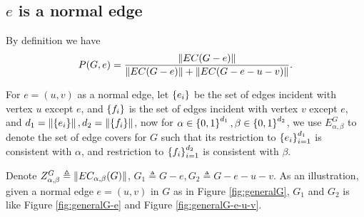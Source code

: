 \subsection{$e$ is a normal edge}
By definition we have
\begin{equation}
	P(G,e) = \frac{\left\Vert EC(G-e)\right\Vert}{\left\Vert EC(G-e)\right\Vert + \left\Vert EC(G-e-u-v)\right\Vert }.
\end{equation}


	For $e=(u,v)$ as a normal edge, let $\left\{e_i\right\}$ be the set of edges incident with vertex $u$ except $e$, and $\left\{f_i\right\}$ is the set of edges incident with vertex $v$ except $e$, and $d_1 = \left\Vert\left\{e_i\right\}\right\Vert, d_2 = \left\Vert\left\{f_i\right\}\right\Vert$, now for $\alpha \in \left\{0,1\right\}^{d_1}, \beta \in \left\{0,1\right\}^{d_2}$, we use $E_{\alpha,\beta}^G$ to denote the set of edge covers for $G$ such that its restriction to $\left\{e_i\right\}_{i=1}^{d_1}$ is consistent with $\alpha$, and restriction to $\left\{f_i\right\}_{i=1}^{d_2}$ is consistent with $\beta$.

	Denote $Z_{\alpha, \beta}^G \triangleq \left\Vert EC_{\alpha, \beta}(G)\right\Vert$, $G_1 \triangleq G-e, G_2 \triangleq G-e-u-v$. As an illustration, given a normal edge $e=(u,v)$ in $G$ as in Figure \ref{fig:generalG}, $G_1$ and $G_2$ is like Figure \ref{fig:generalG-e} and Figure \ref{fig:generalG-e-u-v}.

